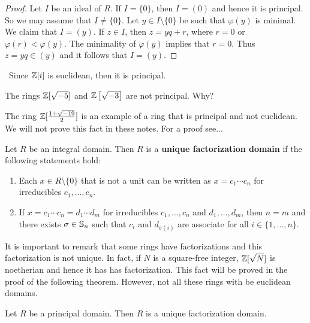 \begin{proof}
	Let $I$ be an ideal of $R$. If $I=\{0\}$, then $I=(0)$ and hence 
	it is principal. So we may
	assume that $I\ne\{0\}$. Let $y\in I\setminus\{0\}$ be such that
	$\varphi(y)$ is minimal. We claim that $I=(y)$. 
	If $z\in I$, then $z=yq+r$, where $r=0$ or $\varphi(r)<\varphi(y)$. 
	The minimality of $\varphi(y)$ implies that $r=0$. Thus $z=yq\in (y)$ and 
	it follows that 
	$I=(y)$. 
\end{proof}

\begin{example}\
	Since $\mathbb{Z}[i]$ is euclidean, then it is principal.
\end{example}
 
\begin{example}
	The rings $\mathbb{Z}[\sqrt{-5}]$ and $\mathbb{Z}\left[\sqrt{-3}\right]$ are
	not principal. Why?
\end{example}

The ring $\mathbb{Z}[\frac{1+\sqrt{-19}}{2}]$ is an 
example of a ring that is principal and not euclidean. We will not prove this
fact in these notes. For a proof see...

\begin{definition}
	Let $R$ be an integral domain. Then $R$ is a 
	\textbf{unique factorization domain}
	if the following statements hold:
	\begin{enumerate}
	\item Each $x\in R\setminus\{0\}$ that is not a unit can be written as $x=c_1\cdots c_n$ for irreducibles $c_1,\dots,c_n$. 
	\item If $x=c_1\cdots c_n=d_1\cdots d_m$ for irreducibles $c_1,\dots,c_n$ and $d_1,\dots,d_m$, then $n=m$ and there exists $\sigma\in\mathbb{S}_n$ such that $c_i$ and $d_{\sigma(i)}$ are
		associate for all $i\in\{1,\dots,n\}$. 
	\end{enumerate}
\end{definition}

It is important to remark that some rings 
have factorizations and this factorization is not unique. 
In fact, if $N$ is a square-free integer, $\mathbb{Z}[\sqrt{N}]$ is noetherian and hence it has  
has factorization. This fact will be proved in the proof of the following theorem. 
However, not all these rings with be euclidean domains. 

\begin{theorem}
	Let $R$ be a principal domain. 
	Then $R$ is a unique factorization domain.
\end{theorem}


